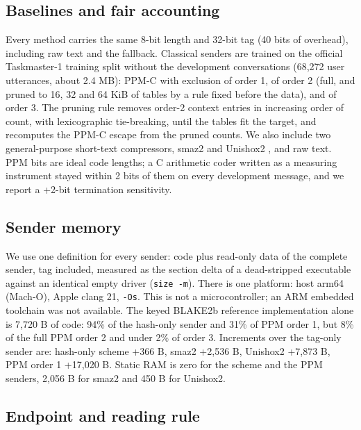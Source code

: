\documentclass[11pt]{article}
\begin{document}
\subsection{Baselines and fair accounting}

Every method carries the same 8-bit length and 32-bit tag (40 bits of overhead), including raw text
and the fallback. Classical senders are trained on the official Taskmaster-1 training split without
the development conversations (68,272 user utterances, about 2.4 MB): PPM-C with exclusion
\cite{cleary1984,moffat1990} of order 1, of order 2 (full, and pruned to 16, 32 and 64 KiB of tables
by a rule fixed before the data), and of order 3. The pruning rule removes order-2 context entries
in increasing order of count, with lexicographic tie-breaking, until the tables fit the target, and
recomputes the PPM-C escape from the pruned counts. We also include two general-purpose short-text
compressors, smaz2 \cite{smaz2} and Unishox2 \cite{unishox2}, and raw text. PPM bits are ideal code
lengths; a C arithmetic coder written as a measuring instrument stayed within 2 bits of them on every
development message, and we report a +2-bit termination sensitivity.

\subsection{Sender memory}

We use one definition for every sender: code plus read-only data of the complete sender, tag
included, measured as the section delta of a dead-stripped executable against an identical empty
driver (\texttt{size -m}). There is one platform: host arm64 (Mach-O), Apple clang 21, \texttt{-Os}.
This is not a microcontroller; an ARM embedded toolchain was not available. The keyed BLAKE2b
reference implementation alone is 7,720 B of code: 94\% of the hash-only sender and 31\% of PPM
order 1, but 8\% of the full PPM order 2 and under 2\% of order 3. Increments over
the tag-only sender are: hash-only scheme +366 B, smaz2 +2,536 B, Unishox2 +7,873 B, PPM order 1
+17,020 B. Static RAM is zero for the scheme and the PPM senders, 2,056 B for smaz2 and 450 B for
Unishox2.

\subsection{Endpoint and reading rule}
\end{document}
